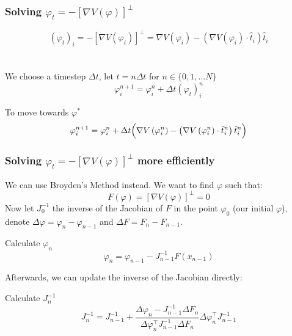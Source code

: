 \documentclass{beamer}
\renewcommand{\phi}{\varphi}
\renewcommand{\(}{\left(}
\renewcommand{\)}{\right)}
\newcommand{\dt}{\Delta t}
\begin{document}
\begin{frame}
\frametitle{Solving $\phi_t=-[\nabla V(\phi)]^\bot$}
$$(\phi_t)_i=-[\nabla V(\phi_i)]^\bot = \nabla V(\phi_i) - (\nabla V(\phi_i) \cdot \hat t_i)\hat t_i$$\\~\\
We choose a timestep $\dt$, let $t=n\dt$ for $n\in\{0, 1, \dots N\}$\\
$$\phi_i^{n+1} = \phi_i^n+\dt(\phi_t)_i^n$$
\begin{block}{To move towards $\phi^*$}
$$\phi_i^{n+1} = \phi_i^n+\dt\Big{(}\nabla V\(\phi_i^n\) - \(\nabla V\(\phi_i^n\) \cdot \hat t_i^n\)\hat t_i^n\Big{)}$$
\end{block}
\end{frame}

\begin{frame}
\frametitle{Solving $\phi_t=-[\nabla V(\phi)]^\bot$ more efficiently}
We can use Broyden's Method instead. We want to find $\phi$ such that:
$$F(\phi)=[\nabla V(\phi)]^\bot = 0$$
Now let $J_0^{-1}$ the inverse of the Jacobian of $F$ in the point $\phi_0$ (our initial $\phi$), denote $\Delta \phi = \phi_{n} - \phi_{n-1}$ and $\Delta F = F_n - F_{n-1}$.
\begin{block}{Calculate $\phi_n$}
$$\phi_{n}=\phi_{n-1} - J_{n-1}^{-1}F(x_{n-1})$$
\end{block}
Afterwards, we can update the inverse of the Jacobian directly:
\begin{block}{Calculate $J_n^{-1}$}
$$J_n^{-1} = J_{n-1}^{-1} + \frac{\Delta \phi_n - J_{n-1}^{-1}\Delta F_n}{\Delta \phi_n^{\top}J_{n-1}^{-1}\Delta F_n}\Delta \phi_n^\top J_{n-1}^{-1}$$
\end{block}

\end{frame}
\end{document}
